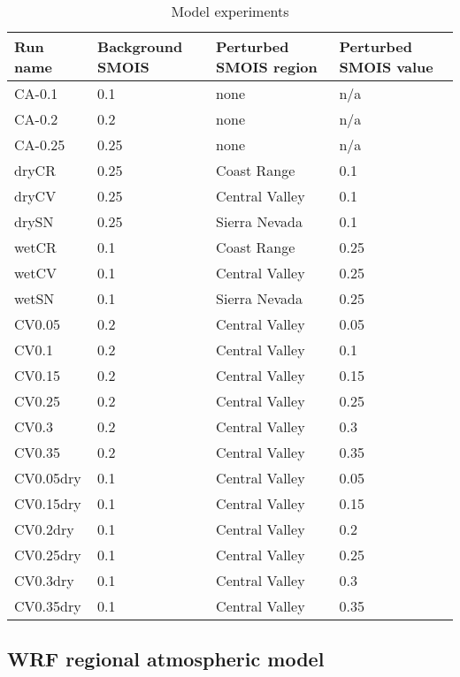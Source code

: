 \documentclass[12pt]{amsart}
\begin{document}
\begin{table}
\begin{tabular}{l l l l}
\hline
Run name & Background SMOIS & Perturbed SMOIS region & Perturbed SMOIS value \\
\hline
CA-0.1 & 0.1 & none & n/a \\
CA-0.2 & 0.2 & none & n/a \\
CA-0.25 & 0.25 & none & n/a \\
dryCR & 0.25 & Coast Range & 0.1 \\
dryCV & 0.25 & Central Valley & 0.1 \\
drySN & 0.25 & Sierra Nevada & 0.1 \\
wetCR & 0.1 & Coast Range & 0.25 \\
wetCV & 0.1 & Central Valley & 0.25 \\
wetSN & 0.1 & Sierra Nevada & 0.25 \\
CV0.05 & 0.2 & Central Valley & 0.05 \\
CV0.1 & 0.2 & Central Valley & 0.1 \\
CV0.15 & 0.2 & Central Valley & 0.15 \\
CV0.25 & 0.2 & Central Valley & 0.25 \\
CV0.3 & 0.2 & Central Valley & 0.3 \\
CV0.35 & 0.2 & Central Valley & 0.35 \\
CV0.05dry & 0.1 & Central Valley & 0.05 \\
CV0.15dry & 0.1 & Central Valley & 0.15 \\
CV0.2dry & 0.1 & Central Valley & 0.2 \\
CV0.25dry & 0.1 & Central Valley & 0.25 \\
CV0.3dry & 0.1 & Central Valley & 0.3 \\
CV0.35dry & 0.1 & Central Valley & 0.35 \\
\hline
\end{tabular}
\caption{Model experiments}
\label{table:windSol_runlist}
\end{table}




\subsection{WRF regional atmospheric model}
\end{document}
